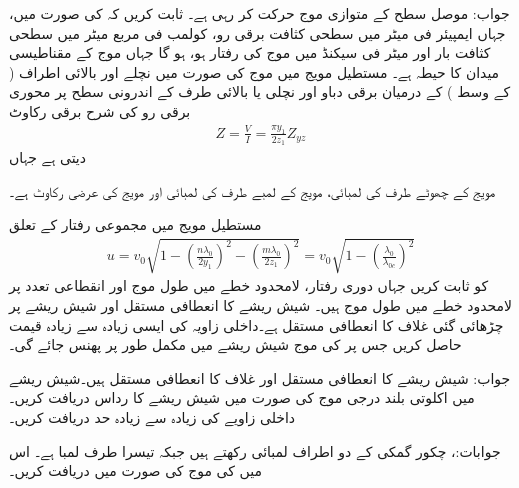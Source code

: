 جواب: 
موصل سطح کے متوازی  موج حرکت کر رہی ہے۔ ثابت کریں کہ  کی صورت میں، جہاں  ایمپیئر فی میٹر میں سطحی کثافت برقی رو،  کولمب فی مربع میٹر میں سطحی کثافت بار اور  میٹر فی سیکنڈ میں موج کی رفتار ہو،  ہو گا جہاں  موج کے مقناطیسی میدان  کا حیطہ ہے۔
مستطیل مویج میں  موج کی صورت میں نچلے اور بالائی اطراف ( کے وسط ) کے درمیان برقی دباو  اور نچلی یا بالائی طرف کے اندرونی سطح پر محوری برقی رو  کی شرح برقی رکاوٹ  
\begin{align}
Z=\frac{V}{I}=\frac{\pi y_1}{2 z_1} Z_{yz}
\end{align}
دیتی ہے جہاں
\begin{description}
 مویج کے چھوٹے طرف کی لمبائی،
 مویج کے لمبے طرف کی لمبائی اور
 مویج کی عرضی رکاوٹ ہے۔
\end{description}
مستطیل مویج میں مجموعی رفتار  کے تعلق
\begin{align}
u=v_0 \sqrt{1-\left(\frac{n \lambda_0}{2 y_1}\right)^2-\left(\frac{m \lambda_0}{2 z_1}\right)^2}=v_0 \sqrt{1-\left(\frac{\lambda_0}{\lambda_{0c}}\right)^2}
\end{align}
کو ثابت کریں جہاں  دوری رفتار،  لامحدود خطے میں طول موج اور  انقطاعی تعدد پر لامحدود خطے میں طول موج ہیں۔
شیش ریشے کا  انعطافی مستقل  اور شیش ریشے پر چڑھائی گئی غلاف کا  انعطافی مستقل  ہے۔داخلی زاویہ  کی ایسی زیادہ سے زیادہ قیمت حاصل کریں جس پر  کی موج شیش ریشے میں مکمل طور پر پھنس جائے گی۔

جواب: 
شیش ریشے کا  انعطافی مستقل  اور غلاف کا  انعطافی مستقل  ہیں۔شیش ریشے میں اکلوتی  بلند درجی موج کی صورت میں شیش ریشے کا رداس دریافت کریں۔ داخلی زاویے کی زیادہ سے زیادہ حد دریافت کریں۔

جوابات:، 
چکور گمکی کے دو اطراف  لمبائی رکھتے ہیں جبکہ تیسرا طرف  لمبا ہے۔ اس میں  کی  موج کی صورت میں  دریافت کریں۔

